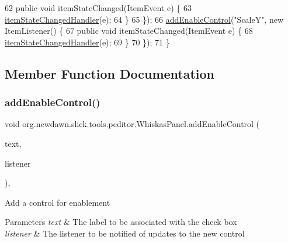 \begin{DoxyCode}
62             \textcolor{keyword}{public} \textcolor{keywordtype}{void} itemStateChanged(ItemEvent e) \{
63                 \mbox{\hyperlink{classorg_1_1newdawn_1_1slick_1_1tools_1_1peditor_1_1_whiskas_panel_a646bd746c6286192f6b1d3ba98f3e25b}{itemStateChangedHandler}}(e);
64             \}
65         \});
66         \mbox{\hyperlink{classorg_1_1newdawn_1_1slick_1_1tools_1_1peditor_1_1_whiskas_panel_aa9cd100f0001b41516cb06b9c6903b7a}{addEnableControl}}(\textcolor{stringliteral}{"ScaleY"}, \textcolor{keyword}{new} ItemListener() \{
67             \textcolor{keyword}{public} \textcolor{keywordtype}{void} itemStateChanged(ItemEvent e) \{
68                 \mbox{\hyperlink{classorg_1_1newdawn_1_1slick_1_1tools_1_1peditor_1_1_whiskas_panel_a646bd746c6286192f6b1d3ba98f3e25b}{itemStateChangedHandler}}(e);
69             \}
70         \});
71     \}
\end{DoxyCode}


\subsection{Member Function Documentation}
\mbox{\label{classorg_1_1newdawn_1_1slick_1_1tools_1_1peditor_1_1_whiskas_panel_aa9cd100f0001b41516cb06b9c6903b7a}} 
\subsubsection{\texorpdfstring{add\+Enable\+Control()}{addEnableControl()}}
{\footnotesize\ttfamily void org.\+newdawn.\+slick.\+tools.\+peditor.\+Whiskas\+Panel.\+add\+Enable\+Control (\begin{DoxyParamCaption}\item[{String}]{text,  }\item[{Item\+Listener}]{listener }\end{DoxyParamCaption})\hspace{0.3cm}{\ttfamily [inline]}, {\ttfamily [private]}}

Add a control for enablement


\begin{DoxyParams}{Parameters}
{\em text} & The label to be associated with the check box \\
\hline
{\em listener} & The listener to be notified of updates to the new control \\
\hline
\end{DoxyParams}

